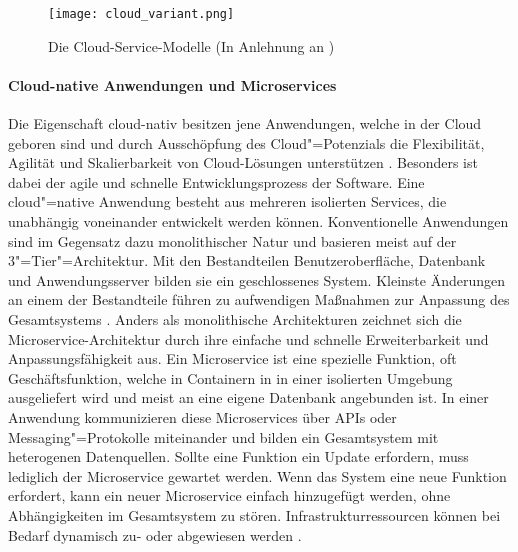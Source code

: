 \begin{figure}[h]
  \centering
  \texttt{[image: cloud\_variant.png]}
  \caption[Die Cloud-Service-Modelle]{Die Cloud-Service-Modelle (In Anlehnung an \citet[S. 88]{Utecht2018})}
  \label{}
\end{figure}

\paragraph{Cloud-native Anwendungen und Microservices}

Die Eigenschaft cloud-nativ besitzen jene Anwendungen, welche in der Cloud \glqq geboren\grqq{} sind und durch Ausschöpfung des Cloud"=Potenzials die Flexibilität, Agilität und Skalierbarkeit von Cloud-Lösungen unterstützen \citep{Acharya2019}. Besonders ist dabei der agile und schnelle Entwicklungsprozess der Software. Eine cloud"=native Anwendung besteht aus mehreren isolierten Services, die unabhängig voneinander entwickelt werden können. Konventionelle Anwendungen sind im Gegensatz dazu monolithischer Natur und basieren meist auf der 3"=Tier"=Architektur. Mit den Bestandteilen Benutzeroberfläche, Datenbank und Anwendungsserver bilden sie ein geschlossenes System. Kleinste Änderungen an einem der Bestandteile führen zu aufwendigen Maßnahmen zur Anpassung des Gesamtsystems \citep{Utecht2018}.
Anders als monolithische Architekturen zeichnet sich die Microservice-Architektur durch ihre einfache und schnelle Erweiterbarkeit und Anpassungsfähigkeit aus. Ein Microservice ist eine spezielle Funktion, oft Geschäftsfunktion, welche in Containern in in einer isolierten Umgebung ausgeliefert wird und meist an eine eigene Datenbank angebunden ist. In einer Anwendung kommunizieren diese Microservices über APIs oder Messaging"=Protokolle miteinander und bilden ein Gesamtsystem mit heterogenen Datenquellen. Sollte eine Funktion ein Update erfordern, muss lediglich der Microservice  gewartet werden. Wenn das System eine neue Funktion erfordert, kann ein neuer Microservice einfach hinzugefügt werden, ohne Abhängigkeiten im Gesamtsystem zu stören. Infrastrukturressourcen können bei Bedarf dynamisch zu- oder abgewiesen werden \citep{Acharya2019}.


